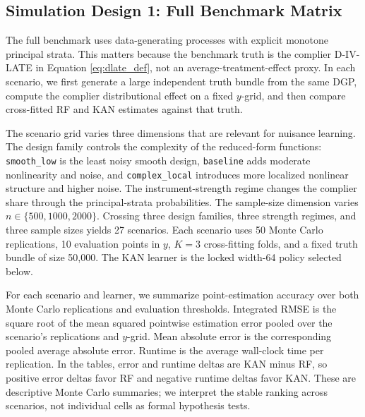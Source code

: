 \documentclass[final,3p,fleqn, 10pt]{elsarticle}
\begin{document}
\subsection{Simulation Design 1: Full Benchmark Matrix}
\label{subsec:sim_dgp1}

The full benchmark uses data-generating processes with explicit monotone principal strata. This matters because the benchmark truth is the complier D-IV-LATE in Equation \ref{eq:dlate_def}, not an average-treatment-effect proxy. In each scenario, we first generate a large independent truth bundle from the same DGP, compute the complier distributional effect on a fixed $y$-grid, and then compare cross-fitted RF and KAN estimates against that truth.

The scenario grid varies three dimensions that are relevant for nuisance learning. The design family controls the complexity of the reduced-form functions: \texttt{smooth\_low} is the least noisy smooth design, \texttt{baseline} adds moderate nonlinearity and noise, and \texttt{complex\_local} introduces more localized nonlinear structure and higher noise. The instrument-strength regime changes the complier share through the principal-strata probabilities. The sample-size dimension varies $n \in \{500,1000,2000\}$. Crossing three design families, three strength regimes, and three sample sizes yields 27 scenarios. Each scenario uses 50 Monte Carlo replications, 10 evaluation points in $y$, $K=3$ cross-fitting folds, and a fixed truth bundle of size 50,000. The KAN learner is the locked width-64 policy selected below.

For each scenario and learner, we summarize point-estimation accuracy over both Monte Carlo replications and evaluation thresholds. Integrated RMSE is the square root of the mean squared pointwise estimation error pooled over the scenario's replications and $y$-grid. Mean absolute error is the corresponding pooled average absolute error. Runtime is the average wall-clock time per replication. In the tables, error and runtime deltas are KAN minus RF, so positive error deltas favor RF and negative runtime deltas favor KAN. These are descriptive Monte Carlo summaries; we interpret the stable ranking across scenarios, not individual cells as formal hypothesis tests.
\end{document}
